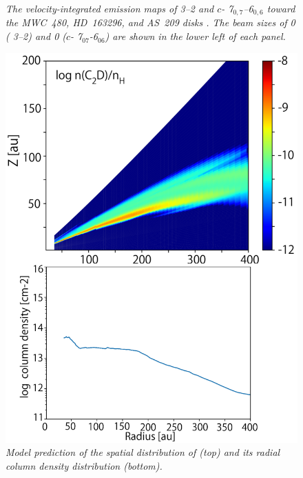 \documentclass[12pt,a4paper]{article}  %
\begin{document}
\begin{figure}[tbph]
\begin{minipage}[b]{0.6\hsize}
\caption{\em{The velocity-integrated emission maps of  3--2 and $c$- 7$_\mathit{0,7}$--6$_\mathit{0,6}$ toward the MWC~480, HD~163296, and AS~209 disks \citep{Guzman21}. The beam sizes of 0 ( 3--2) and 0 ($c$- 7$_\mathit{07}$-6$_\mathit{06}$) are shown in the lower left of each panel.}}
\label{fig:C2H_garelly}
\end{minipage}
\end{figure}


\begin{figure}[tbh]
\centering
\begin{minipage}[b]{0.35\hsize}
\centering
\includegraphics[scale=0.55]{model_C2D_HD163296}
\caption{\em{Model prediction of the spatial distribution of  (top) and its radial column density distribution (bottom).}}
\label{fig:C2D_model}
\end{minipage}
\hspace{1em}
\begin{minipage}[b]{0.6\hsize}

\end{minipage}
\end{figure}
\end{document}
